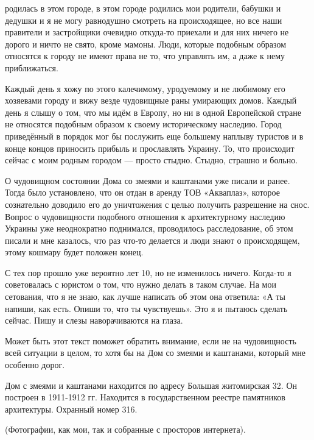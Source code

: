 родилась в этом городе, в этом городе родились мои родители, бабушки и дедушки
и я не могу равнодушно смотреть на происходящее, но все наши правители и
застройщики очевидно откуда-то приехали и для них ничего не дорого и ничто не
свято, кроме мамоны. Люди, которые подобным образом относятся к городу не имеют
права не то, что управлять им, а даже к нему приближаться. 

Каждый день я хожу по этого калечимому, уродуемому и не любимому его хозяевами
городу и вижу везде чудовищные раны умирающих домов. Каждый день я слышу о том,
что мы идём в Европу, но ни в одной Европейской стране не относятся подобным
образом к своему историческому наследию. Город приведённый в порядок мог бы
послужить еще большему наплыву туристов и в конце концов приносить прибыль и
прославлять Украину. То, что происходит сейчас с моим родным городом — просто
стыдно. Стыдно, страшно и больно. 

О чудовищном состоянии Дома со змеями и каштанами уже писали и ранее. Тогда
было установлено, что он отдан в аренду ТОВ «Акваплаз», которое сознательно
доводило его до уничтожения с целью получить разрешение на снос. Вопрос о
чудовищности подобного отношения к архитектурному наследию Украины уже
неоднократно поднимался, проводилось расследование, об этом писали и мне
казалось, что раз что-то делается и люди знают о происходящем, этому кошмару
будет положен конец. 

С тех пор прошло уже вероятно лет 10, но не изменилось ничего. Когда-то я
советовалась с юристом о том, что нужно делать в таком случае. На мои
сетования, что я не знаю, как лучше написать об этом она ответила: «А ты
напиши, как есть. Опиши то, что ты чувствуешь». Это я и пытаюсь сделать сейчас.
Пишу и слезы наворачиваются на глаза.

Может быть этот текст поможет обратить внимание, если не на чудовищность всей
ситуации в целом, то хотя бы на Дом со змеями и каштанами, который мне особенно
дорог.

Дом с змеями и каштанами находится по адресу Большая житомирская 32. Он
построен в 1911-1912 гг. Находится в государственном реестре памятников
архитектуры. Охранный номер 316.

(Фотографии, как мои, так и собранные с просторов интернета).

